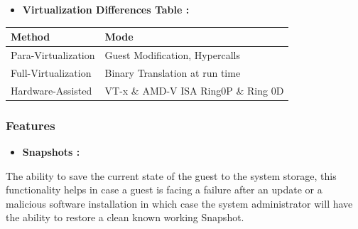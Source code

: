 \documentclass[
  14pt,
  english,
  a4paper,
]{scrreprt}
\providecommand{\tightlist}{%
  \setlength{\itemsep}{0pt}\setlength{\parskip}{0pt}}
\begin{document}
\begin{itemize}
\tightlist
\item
  \textbf{Virtualization Differences Table :}
\end{itemize}

\begin{longtable}[]{@{}ll@{}}
\toprule
\begin{minipage}[b]{0.29\columnwidth}\raggedright
Method\strut
\end{minipage} & \begin{minipage}[b]{0.47\columnwidth}\raggedright
Mode\strut
\end{minipage}\tabularnewline
\midrule
\endhead
\begin{minipage}[t]{0.29\columnwidth}\raggedright
Para-Virtualization\strut
\end{minipage} & \begin{minipage}[t]{0.47\columnwidth}\raggedright
Guest Modification, Hypercalls\strut
\end{minipage}\tabularnewline
\begin{minipage}[t]{0.29\columnwidth}\raggedright
Full-Virtualization\strut
\end{minipage} & \begin{minipage}[t]{0.47\columnwidth}\raggedright
Binary Translation at run time\strut
\end{minipage}\tabularnewline
\begin{minipage}[t]{0.29\columnwidth}\raggedright
Hardware-Assisted\strut
\end{minipage} & \begin{minipage}[t]{0.47\columnwidth}\raggedright
VT-x \& AMD-V ISA Ring0P \& Ring 0D\strut
\end{minipage}\tabularnewline
\bottomrule
\end{longtable}

\hypertarget{features}{%
\subsubsection{Features}\label{features}}

\begin{itemize}
\tightlist
\item
  \textbf{Snapshots :}
\end{itemize}

The ability to save the current state of the guest to the system
storage, this functionality helps in case a guest is facing a failure
after an update or a malicious software installation in which case the
system administrator will have the ability to restore a clean known
working Snapshot.
\end{document}
